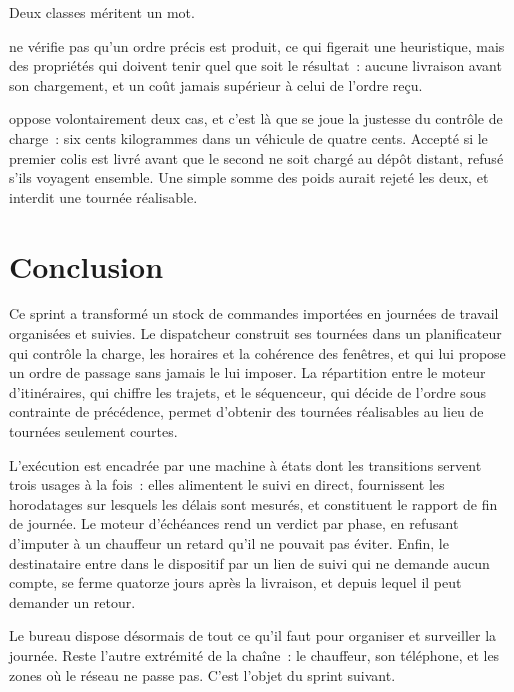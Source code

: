 Deux classes méritent un mot.

 ne vérifie pas qu'un ordre précis est produit, ce qui figerait
une heuristique, mais des propriétés qui doivent tenir quel que soit le résultat~: aucune livraison
avant son chargement, et un coût jamais supérieur à celui de l'ordre reçu.

 oppose volontairement deux cas, et c'est là que se joue la justesse du
contrôle de charge~: six cents kilogrammes dans un véhicule de quatre cents. Accepté si le premier
colis est livré avant que le second ne soit chargé au dépôt distant, refusé s'ils voyagent ensemble.
Une simple somme des poids aurait rejeté les deux, et interdit une tournée réalisable.

\section{Conclusion}

Ce sprint a transformé un stock de commandes importées en journées de travail organisées et suivies.
Le dispatcheur construit ses tournées dans un planificateur qui contrôle la charge, les horaires et
la cohérence des fenêtres, et qui lui propose un ordre de passage sans jamais le lui imposer. La
répartition entre le moteur d'itinéraires, qui chiffre les trajets, et le séquenceur, qui décide de
l'ordre sous contrainte de précédence, permet d'obtenir des tournées réalisables au lieu de tournées
seulement courtes.

L'exécution est encadrée par une machine à états dont les transitions servent trois usages à la
fois~: elles alimentent le suivi en direct, fournissent les horodatages sur lesquels les délais sont
mesurés, et constituent le rapport de fin de journée. Le moteur d'échéances rend un verdict par
phase, en refusant d'imputer à un chauffeur un retard qu'il ne pouvait pas éviter. Enfin, le
destinataire entre dans le dispositif par un lien de suivi qui ne demande aucun compte, se ferme
quatorze jours après la livraison, et depuis lequel il peut demander un retour.

Le bureau dispose désormais de tout ce qu'il faut pour organiser et surveiller la journée. Reste
l'autre extrémité de la chaîne~: le chauffeur, son téléphone, et les zones où le réseau ne passe pas.
C'est l'objet du sprint suivant.

